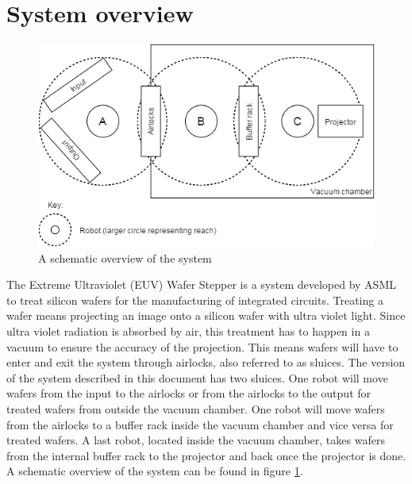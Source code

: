 \documentclass[12pt]{report}
\begin{document}
	\section{System overview}
	\begin{figure}
		\centering
		\includegraphics[scale=0.7]{systemmodel}
		\caption{A schematic overview of the system}
		\label{fig:overview}
	\end{figure}
	The Extreme Ultraviolet (EUV) Wafer Stepper is a system developed by ASML to treat silicon wafers for the manufacturing of integrated circuits. Treating a wafer means projecting an image onto a silicon wafer with ultra violet light. Since ultra violet radiation is absorbed by air, this treatment has to happen in a vacuum to ensure the accuracy of the projection. This means wafers will have to enter and exit the system through airlocks, also referred to as sluices. The version of the system described in this document has two sluices. One robot will move wafers from the input to the airlocks or from the airlocks to the output for treated wafers from outside the vacuum chamber. One robot will move wafers from the airlocks to a buffer rack inside the vacuum chamber and vice versa for treated wafers. A last robot, located inside the vacuum chamber, takes wafers from the internal buffer rack to the projector and back once the projector is done. A schematic overview of the system can be found in figure \ref{fig:overview}.
\end{document}
